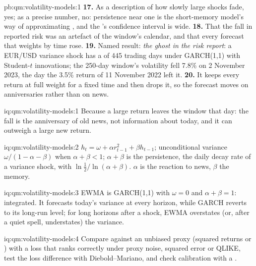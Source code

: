 \begin{solution}{pb:qm:volatility-models:1}
\textbf{17.} As a description of how slowly large shocks fade, yes; as a precise number, no: persistence near one is the short-memory model's way of approximating
, and the 's confidence interval is wide.
\textbf{18.} That the fall in reported risk was an artefact of the window's calendar, and that every forecast that weights by time rose.
\textbf{19.} Named result: \emph{the ghost in the risk report}: a EUR/USD variance shock has a  of 445 trading days under GARCH(1,1) with Student-$t$
innovations; the 250-day window's volatility fell 7.8\% on 2 November 2023, the day the 3.5\% return of 11 November 2022 left it.
\textbf{20.} It keeps every return at full weight for a fixed time and then drops it, so the forecast moves on anniversaries rather than on news.
\end{solution}

\begin{solution}{iq:qm:volatility-models:1}
Because a large return leaves the window that day: the fall is the anniversary of old news, not information about today, and it can outweigh a large new return.
\end{solution}

\begin{solution}{iq:qm:volatility-models:2}
$h_t = \omega + \alpha r_{t-1}^2 + \beta h_{t-1}$; unconditional variance $\omega/(1 - \alpha - \beta)$ when $\alpha + \beta < 1$; $\alpha + \beta$ is the persistence, the daily decay rate
of a variance shock, with  $\ln\frac12/\ln(\alpha + \beta)$. $\alpha$ is the reaction to news, $\beta$ the memory.
\end{solution}

\begin{solution}{iq:qm:volatility-models:3}
EWMA is GARCH(1,1) with $\omega = 0$ and $\alpha + \beta = 1$: integrated. It forecasts today's variance at every horizon, while GARCH reverts to its long-run level; for
long horizons after a shock, EWMA overstates (or, after a quiet spell, understates) the variance.
\end{solution}

\begin{solution}{iq:qm:volatility-models:4}
Compare against an unbiased proxy (squared returns or ) with a loss that ranks correctly under proxy noise, squared error or QLIKE, test the loss
difference with Diebold--Mariano, and check calibration with a .
\end{solution}

